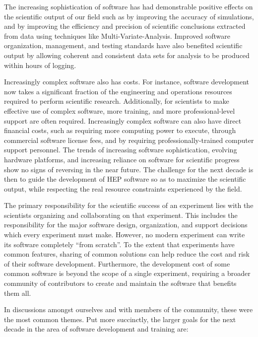 The increasing sophistication of \HEP software has had demonstrable positive effects on the scientific output of our field
such as by improving the accuracy
of simulations, and by improving the efficiency and precision of scientific conclusions extracted from data using
techniques like Multi-Variate-Analysis.
Improved software organization, management, and testing standards have also benefited scientific output by allowing coherent and consistent data sets for analysis to be produced within hours of logging.

Increasingly complex software also has costs.  For instance, software development now takes a significant fraction
of the engineering and operations resources required to perform
\HEP scientific research.  Additionally, for scientists to
make effective use of complex software, more training, and more professional-level support are often required.
Increasingly complex software can also have direct financial costs, such as requiring more computing power to
execute, through commercial software license fees, and by requiring professionally-trained computer support personnel.
The trends of increasing software sophistication, evolving hardware platforms, and
increasing reliance on software for scientific progress show no signs of reversing in the near future.
The challenge for the next decade is then to guide the development of HEP software so as to maximize the scientific
output, while respecting the real resource constraints experienced by the field.

The primary responsibility for the scientific success of an experiment lies with the scientists organizing
and collaborating on that experiment.  This includes the responsibility for the major software design, organization,
and support decisions which every experiment must make.  However, no modern experiment can write its software completely
``from scratch''.  To the extent that experiments have common features, sharing of common solutions can help reduce the
cost and risk of their software development.  Furthermore, the development cost of some common software is beyond the scope of
a single experiment, requiring a broader community of contributors to create and maintain the software that benefits
them all.  


In discussions amongst ourselves and with members of the \HEP community,
these were the most common themes. Put more succinctly, the larger
goals for the next decade in the area
of software development and training are:

